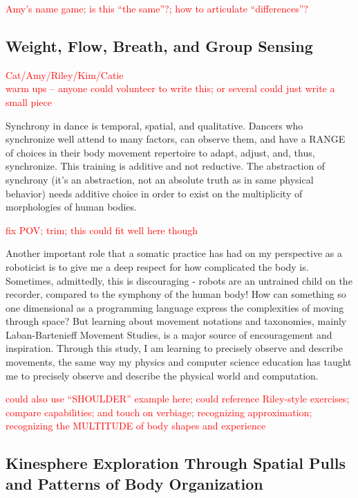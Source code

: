 \documentclass[arts,article,submit,moreauthors,pdftex,10pt,a4paper]{mdpi}
\begin{document}
\textcolor{red}{Amy's name game; is this ``the same''?; how to articulate ``differences''?}

\subsection{Weight, Flow, Breath, and Group Sensing}

\textcolor{red}{Cat/Amy/Riley/Kim/Catie \\ warm ups -- anyone could volunteer to write this; or several could just write a small piece}

Synchrony in dance is temporal, spatial, and qualitative. Dancers who synchronize well attend to many factors, can observe them, and have a RANGE of choices in their body movement repertoire to adapt, adjust, and, thus, synchronize. This training is additive and not reductive.  The abstraction of synchrony (it's an abstraction, not an absolute truth as in same physical behavior) needs additive choice in order to exist on the multiplicity of morphologies of human bodies.

\textcolor{red}{fix POV; trim; this could fit well here though}

Another important role that a somatic practice has had on my perspective as a roboticist is to give me a deep respect for how complicated the body is. Sometimes, admittedly, this is discouraging - robots are an untrained child on the recorder, compared to the symphony of the human body! How can something so one dimensional as a programming language express the complexities of moving through space? But learning about movement notations and taxonomies, mainly Laban-Bartenieff Movement Studies, is a major source of encouragement and inspiration. Through this study, I am learning to precisely observe and describe movements, the same way my physics and computer science education has taught me to precisely observe and describe the physical world and computation.

\textcolor{red}{could also use ``SHOULDER'' example here; could reference Riley-style exercises; compare capabilities; and touch on verbiage; recognizing approximation; recognizing the MULTITUDE of body shapes and experience}

\subsection{Kinesphere Exploration Through Spatial Pulls and Patterns of Body Organization}
\end{document}
